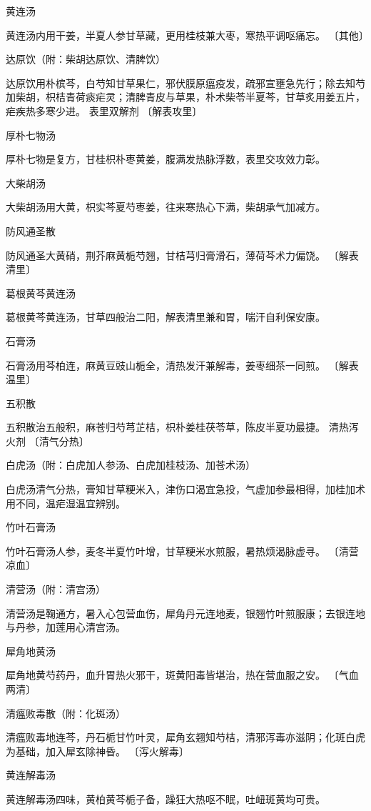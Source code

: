 \documentclass[a4paper,12pt,UTF8,twoside]{ctexbook}
\begin{document}
黄连汤

黄连汤内用干姜，半夏人参甘草藏，更用桂枝兼大枣，寒热平调呕痛忘。
〔其他〕

达原饮（附：柴胡达原饮、清脾饮）

达原饮用朴槟芩，白芍知甘草果仁，邪伏膜原瘟疫发，疏邪宣壅急先行；除去知芍加柴胡，枳桔青荷痰疟灵；清脾青皮与草果，朴术柴苓半夏芩，甘草炙用姜五片，疟疾热多寒少进。
表里双解剂
〔解表攻里〕

厚朴七物汤

厚朴七物是复方，甘桂枳朴枣黄姜，腹满发热脉浮数，表里交攻效力彰。

大柴胡汤

大柴胡汤用大黄，枳实芩夏芍枣姜，往来寒热心下满，柴胡承气加减方。

防风通圣散

防风通圣大黄硝，荆芥麻黄栀芍翘，甘桔芎归膏滑石，薄荷芩术力偏饶。
〔解表清里〕

葛根黄芩黄连汤

葛根黄芩黄连汤，甘草四般治二阳，解表清里兼和胃，喘汗自利保安康。

石膏汤

石膏汤用芩柏连，麻黄豆豉山栀全，清热发汗兼解毒，姜枣细茶一同煎。
〔解表温里〕

五积散

五积散治五般积，麻苍归芍芎芷桔，枳朴姜桂茯苓草，陈皮半夏功最捷。
清热泻火剂
〔清气分热〕

白虎汤（附：白虎加人参汤、白虎加桂枝汤、加苍术汤）

白虎汤清气分热，膏知甘草粳米入，津伤口渴宜急投，气虚加参最相得，加桂加术用不同，温疟湿温宜辨别。

竹叶石膏汤

竹叶石膏汤人参，麦冬半夏竹叶增，甘草粳米水煎服，暑热烦渴脉虚寻。
〔清营凉血〕

清营汤（附：清宫汤）

清营汤是鞠通方，暑入心包营血伤，犀角丹元连地麦，银翘竹叶煎服康；去银连地与丹参，加莲用心清宫汤。

犀角地黄汤

犀角地黄芍药丹，血升胃热火邪干，斑黄阳毒皆堪治，热在营血服之安。
〔气血两清〕

清瘟败毒散（附：化斑汤）

清瘟败毒地连芩，丹石栀甘竹叶灵，犀角玄翘知芍桔，清邪泻毒亦滋阴；化斑白虎为基础，加入犀玄除神昏。
〔泻火解毒〕

黄连解毒汤

黄连解毒汤四味，黄柏黄芩栀子备，躁狂大热呕不眠，吐衄斑黄均可贵。
\end{document}
